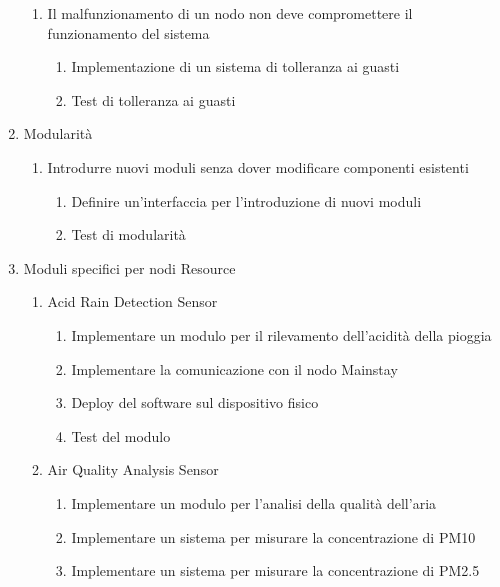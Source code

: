 \begin{enumerate}
\begin{enumerate}
              \item Il malfunzionamento di un nodo non deve compromettere il funzionamento del sistema
                    \begin{enumerate}
                        \item Implementazione di un sistema di tolleranza ai guasti
                        \item Test di tolleranza ai guasti
                    \end{enumerate}
          \end{enumerate}
    \item Modularità
          \begin{enumerate}
              \item Introdurre nuovi moduli senza dover modificare componenti esistenti
                    \begin{enumerate}
                        \item Definire un'interfaccia per l'introduzione di nuovi moduli
                        \item Test di modularità
                    \end{enumerate}
          \end{enumerate}
    \item Moduli specifici per nodi Resource
          \begin{enumerate}
              \item Acid Rain Detection Sensor
                    \begin{enumerate}
                        \item Implementare un modulo per il rilevamento dell'acidità della pioggia
                        \item Implementare la comunicazione con il nodo Mainstay
                        \item Deploy del software sul dispositivo fisico
                        \item Test del modulo
                    \end{enumerate}
              \item Air Quality Analysis Sensor
                    \begin{enumerate}
                        \item Implementare un modulo per l'analisi della qualità dell'aria
                        \item Implementare un sistema per misurare la concentrazione di PM10
                        \item Implementare un sistema per misurare la concentrazione di PM2.5

\end{enumerate}
\end{enumerate}
\end{enumerate}
